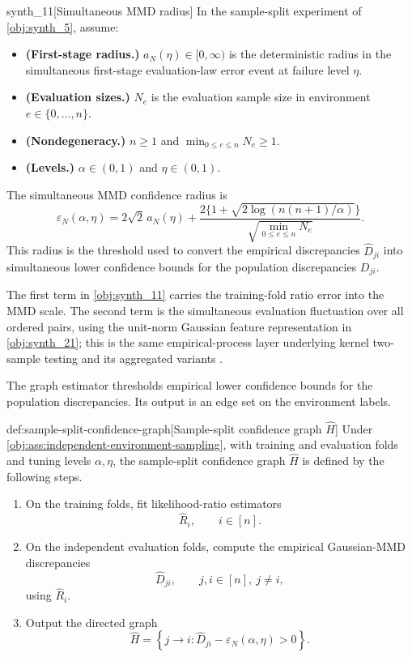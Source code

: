 \documentclass[11pt]{article}
\begin{document}
\begin{definitionv}{synth_11}[Simultaneous MMD radius]
In the sample-split experiment of \cref{obj:synth_5}, assume:
\begin{itemize}
\item \textbf{(First-stage radius.)} \(a_N(\eta)\in[0,\infty)\) is the deterministic radius in the simultaneous first-stage evaluation-law error event at failure level \(\eta\).
\item \textbf{(Evaluation sizes.)} \(N_e\) is the evaluation sample size in environment \(e\in\{0,\ldots,n\}\).
\item \textbf{(Nondegeneracy.)} \(n\ge1\) and \(\min_{0\le e\le n}N_e\ge1\).
\item \textbf{(Levels.)} \(\alpha\in(0,1)\) and \(\eta\in(0,1)\).
\end{itemize}
The simultaneous MMD confidence radius is
\[
\varepsilon_N(\alpha,\eta)
=
2\sqrt 2\,a_N(\eta)
+
\frac{2\{1+\sqrt{2\log(n(n+1)/\alpha)}\}}
{\sqrt{\min_{0\le e\le n}N_e}} .
\]
This radius is the threshold used to convert the empirical discrepancies \(\widehat D_{ji}\) into simultaneous lower confidence bounds for the population discrepancies \(D_{ji}\).
\end{definitionv}

The first term in \cref{obj:synth_11} carries the training-fold ratio error into the MMD scale. The second term is the simultaneous evaluation fluctuation over all ordered pairs, using the unit-norm Gaussian feature representation in \cref{obj:synth_21}; this is the same empirical-process layer underlying kernel two-sample testing and its aggregated variants \citep{GrettonEtAl2012KernelTwoSample,SchrabEtAl2023MMDAgg}.

The graph estimator thresholds empirical lower confidence bounds for the population discrepancies. Its output  is an edge set on the environment labels.

\begin{algorithmv}{def:sample-split-confidence-graph}[Sample-split confidence graph $\widehat H$]
Under \cref{obj:ass:independent-environment-sampling}, with training and evaluation folds and tuning levels \(\alpha,\eta\), the sample-split confidence graph \(\widehat H\) is defined by the following steps.
\begin{enumerate}
\item On the training folds, fit likelihood-ratio estimators
\[
\widehat R_i,
\qquad i\in[n].
\]

\item On the independent evaluation folds, compute the empirical Gaussian-MMD discrepancies
\[
\widehat D_{ji},
\qquad j,i\in[n],\ j\ne i,
\]
using \(\widehat R_i\).

\item Output the directed graph
\[
\widehat H
=
\left\{
j\to i:
\widehat D_{ji}-\varepsilon_N(\alpha,\eta)>0
\right\}.
\]
\end{enumerate}
\end{algorithmv}
\end{document}
